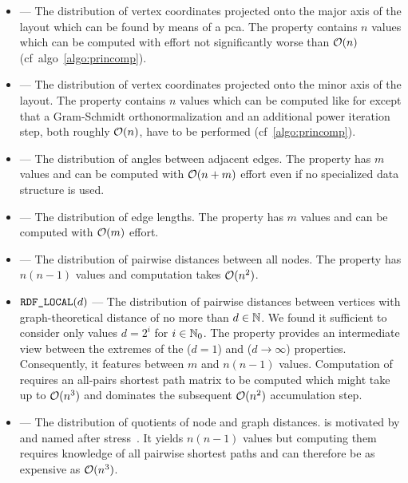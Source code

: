 \documentclass{graphstudy}
\begin{document}
\begin{itemize}
\item{} --- The distribution of vertex coordinates projected onto the major axis of the layout which can
  be found by means of a \ac{pca}.  The property contains \(n\) values which can be computed with effort not
  significantly worse than \(\operatorname{\mathcal{O}}(n)\) (\acs{cf}~\acs{algo}~\ref{algo:princomp}).
\item{} --- The distribution of vertex coordinates projected onto the minor axis of the layout.  The
  property contains \(n\) values which can be computed like for  except that a Gram-Schmidt
  orthonormalization and an additional power iteration step, both roughly \(\operatorname{\mathcal{O}}(n)\), have to be performed
  (\acs{cf}~\ref{algo:princomp}).
\item{} --- The distribution of angles between adjacent edges.  The property has \(m\) values and can be
  computed with \(\operatorname{\mathcal{O}}(n+m)\) effort even if no specialized data structure is used.
\item{} --- The distribution of edge lengths.  The property has \(m\) values and can be computed with
  \(\operatorname{\mathcal{O}}(m)\) effort.
\item{} --- The distribution of pairwise distances between all nodes.  The property has \(n(n-1)\)
  values and computation takes \(\operatorname{\mathcal{O}}(n^2)\).
\item\(\mbox{\text{\upshape\ttfamily RDF\_LOCAL}}(d)\) --- The distribution of pairwise distances between vertices with graph-theoretical
  distance of no more than \(d\in\mathbb{N}\).  We found it sufficient to consider only values \(d=2^i\) for
  \(i\in\mathbb{N}_0\).  The property  provides an intermediate view between the extremes of the
   (\(d=1\)) and  (\(d\to\infty\)) properties.  Consequently, it features between
  \(m\) and \(n(n-1)\) values.  Computation of  requires an all-pairs shortest path matrix to be
  computed which might take up to \(\operatorname{\mathcal{O}}(n^3)\) and dominates the subsequent \(\operatorname{\mathcal{O}}(n^2)\) accumulation step.
\item{} --- The distribution of quotients of node and graph distances.   is motivated by and
  named after stress~\cite{Kamada1989}.  It yields \(n(n-1)\) values but computing them requires knowledge of all
  pairwise shortest paths and can therefore be as expensive as \(\operatorname{\mathcal{O}}(n^3)\).
\end{itemize}
\end{document}
